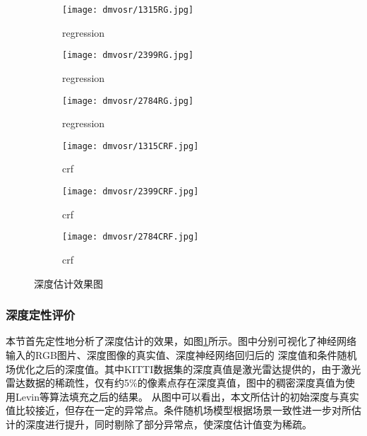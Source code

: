 \begin{figure}[h]
    \vspace*{2mm}
    \begin{subfigure}[c]{0.32\textwidth}
        \texttt{[image: dmvosr/1315RG.jpg]}
        \caption{regression}
    \end{subfigure}
    \vspace*{2mm}
    \begin{subfigure}[c]{0.32\textwidth}
        \texttt{[image: dmvosr/2399RG.jpg]}
        \caption{regression}
    \end{subfigure}
    \vspace*{2mm}
    \begin{subfigure}[c]{0.32\textwidth}
        \texttt{[image: dmvosr/2784RG.jpg]}
        \caption{regression}
    \end{subfigure}
    \vspace*{2mm}
    \begin{subfigure}[c]{0.32\textwidth}
        \texttt{[image: dmvosr/1315CRF.jpg]}
        \caption{crf}
    \end{subfigure}
    \begin{subfigure}[c]{0.32\textwidth}
        \texttt{[image: dmvosr/2399CRF.jpg]}
        \caption{crf}
    \end{subfigure}
    \begin{subfigure}[c]{0.32\textwidth}
        \texttt{[image: dmvosr/2784CRF.jpg]}
        \caption{crf}
    \end{subfigure}

    \caption{深度估计效果图}
    \label{fig:depth_estimation}
\end{figure}
\subsubsection{深度定性评价}
本节首先定性地分析了深度估计的效果，如图\ref{fig:depth_estimation}所示。图中分别可视化了神经网络输入的RGB图片、深度图像的真实值、深度神经网络回归后的
深度值和条件随机场优化之后的深度值。其中KITTI数据集的深度真值是激光雷达提供的，由于激光雷达数据的稀疏性，仅有约5\%的像素点存在深度真值，图中的稠密深度真值为使用Levin等\cite{levin2004colorization}算法填充之后的结果。
从图中可以看出，本文所估计的初始深度与真实值比较接近，但存在一定的异常点。条件随机场模型根据场景一致性进一步对所估计的深度进行提升，同时剔除了部分异常点，使深度估计值变为稀疏。


